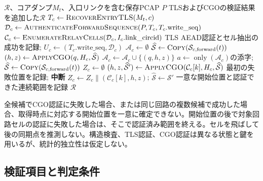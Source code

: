 \documentclass[10pt,a4paper]{ltjsarticle}
\begin{document}
\begin{algorithm}[H]
\caption{TLSレコードとCGO層を順に処理する保存通信の復号}
\label{alg:traffic-recovery}
\small
\begin{algorithmic}[1]
\Require $\mathcal{R}$、コアダンプ$M_t$、入口リンクを含む保存PCAP $P$
\Ensure TLSおよびCGOの検証結果を追加した$\mathcal{R}$
  \State $T_c\gets\Call{RecoverEntryTLS}{M_t,c}$
    \State $\mathcal{D}_c\gets\Call{AuthenticateForwardSequence}{P,T_c,T_c.\mathrm{write\_seq}}$
    \State $\mathcal{C}_c\gets\Call{EnumerateRelayCells}{\mathcal{D}_c,I_c.\mathrm{link\_circid}}$
      \State TLS AEAD認証とセル抽出の成功を記録; $U_c\gets(T_c.\mathrm{write\_seq},\mathcal{D}_c)$
      \State $\mathcal{A}_c\gets\emptyset$
        \State $\widehat{\mathcal{S}}\gets\Call{Copy}{\mathcal{S}_{c,\mathrm{forward}}(t)}$
        \State $(h,z)\gets\Call{ApplyCGO}{q,H_c,\widehat{\mathcal{S}}}$
          \State $\mathcal{A}_c\gets\mathcal{A}_c\cup\{(q,h,z)\}$
        \EndIf
      \EndFor
        \State $a\gets\operatorname{only}(\mathcal{A}_c)$の添字; $\widehat{\mathcal{S}}\gets\Call{Copy}{\mathcal{S}_{c,\mathrm{forward}}(t)}$
        \State $Z_c\gets\emptyset$
          \State $(h,z,\widehat{\mathcal{S}}')\gets\Call{ApplyCGO}{\mathcal{C}_c[k],H_c,\widehat{\mathcal{S}}}$
            \State 最初の失敗位置を記録; \textbf{中断}
          \EndIf
          \State $Z_c\gets Z_c\mathbin{\|}(\mathcal{C}_c[k],h,z)$; $\widehat{\mathcal{S}}\gets\widehat{\mathcal{S}}'$
        \EndFor
        \State 一意な開始位置と認証できた連続範囲を記録
      \EndIf
    \EndIf
  \EndIf
\EndFor
\State \Return $\mathcal{R}$
\end{algorithmic}
\end{algorithm}

全候補でCGO認証に失敗した場合、または同じ回路の複数候補で成功した場合、取得時点に対応する開始位置を一意に確定できない。開始位置の後で対象回路セルの認証に失敗した場合は、そこで認証済み範囲を終える。セルを飛ばして後の同期点を推測しない。構造検査、TLS認証、CGO認証は異なる状態と鍵を用いるが、統計的独立性は仮定しない。

\subsection{検証項目と判定条件}
\end{document}
